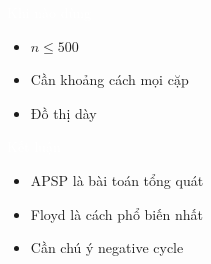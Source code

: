 \documentclass{beamer}
\newcommand{\hlwhite}[1]{\textcolor{white}{#1}}
\begin{document}

\begin{frame}{\hlwhite{Khi nào dùng}}
\begin{itemize}
\item $n \le 500$
\item Cần khoảng cách mọi cặp
\item Đồ thị dày
\end{itemize}
\end{frame}


\begin{frame}{\hlwhite{Kết luận}}
\begin{itemize}
\item APSP là bài toán tổng quát
\item Floyd là cách phổ biến nhất
\item Cần chú ý negative cycle
\end{itemize}
\end{frame}
\end{document}
